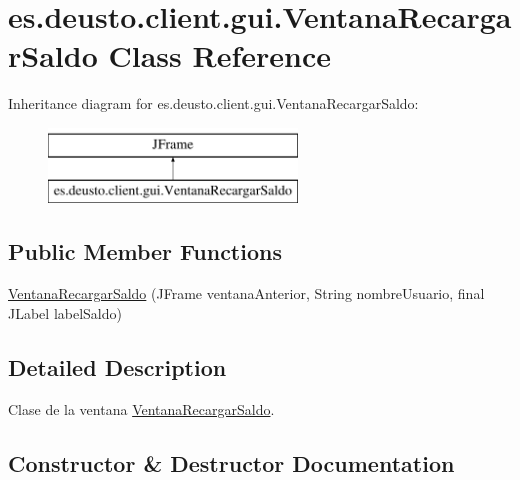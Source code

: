 \hypertarget{classes_1_1deusto_1_1client_1_1gui_1_1_ventana_recargar_saldo}{}\section{es.\+deusto.\+client.\+gui.\+Ventana\+Recargar\+Saldo Class Reference}
\label{classes_1_1deusto_1_1client_1_1gui_1_1_ventana_recargar_saldo}
Inheritance diagram for es.\+deusto.\+client.\+gui.\+Ventana\+Recargar\+Saldo\+:\begin{figure}[H]
\begin{center}
\leavevmode
\includegraphics[height=2.000000cm]{classes_1_1deusto_1_1client_1_1gui_1_1_ventana_recargar_saldo}
\end{center}
\end{figure}
\subsection*{Public Member Functions}
\begin{DoxyCompactItemize}
\item 
\mbox{\hyperlink{classes_1_1deusto_1_1client_1_1gui_1_1_ventana_recargar_saldo_a175b7e027a7841b53769f09b173ceffc}{Ventana\+Recargar\+Saldo}} (J\+Frame ventana\+Anterior, String nombre\+Usuario, final J\+Label label\+Saldo)
\end{DoxyCompactItemize}


\subsection{Detailed Description}
Clase de la ventana \mbox{\hyperlink{classes_1_1deusto_1_1client_1_1gui_1_1_ventana_recargar_saldo}{Ventana\+Recargar\+Saldo}}. 

\subsection{Constructor \& Destructor Documentation}
\mbox{\label{classes_1_1deusto_1_1client_1_1gui_1_1_ventana_recargar_saldo_a175b7e027a7841b53769f09b173ceffc}} 
